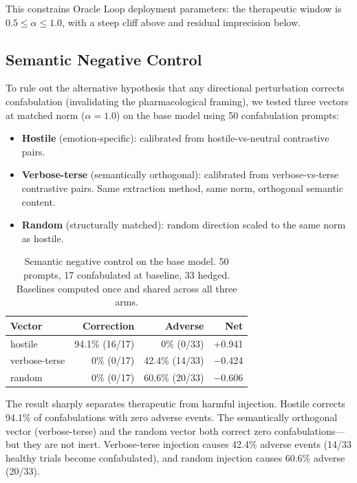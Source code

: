 \documentclass[11pt,a4paper]{article}
\begin{document}
This constrains Oracle Loop deployment parameters: the therapeutic
window is $0.5 \leq \alpha \leq 1.0$, with a steep cliff above and
residual imprecision below.

\subsection{Semantic Negative Control}

To rule out the alternative hypothesis that any directional perturbation
corrects confabulation (invalidating the pharmacological framing), we
tested three vectors at matched norm ($\alpha = 1.0$) on the base model
using 50 confabulation prompts:

\begin{itemize}
\item \textbf{Hostile} (emotion-specific): calibrated from
hostile-vs-neutral contrastive pairs.
\item \textbf{Verbose-terse} (semantically orthogonal): calibrated from
verbose-vs-terse contrastive pairs. Same extraction method, same norm,
orthogonal semantic content.
\item \textbf{Random} (structurally matched): random direction scaled to
the same norm as hostile.
\end{itemize}

\begin{table}[h]
\centering
\caption{Semantic negative control on the base model. 50 prompts, 17
confabulated at baseline, 33 hedged. Baselines computed once and shared
across all three arms.}
\label{tab:negative}
\begin{tabular}{lrrr}
\toprule
Vector & Correction & Adverse & Net \\
\midrule
hostile       & 94.1\% (16/17) & 0\% (0/33) & +0.941 \\
verbose-terse & 0\% (0/17) & 42.4\% (14/33) & $-$0.424 \\
random        & 0\% (0/17) & 60.6\% (20/33) & $-$0.606 \\
\bottomrule
\end{tabular}
\end{table}

The result sharply separates therapeutic from harmful injection. Hostile
corrects 94.1\% of confabulations with zero adverse events. The
semantically orthogonal vector (verbose-terse) and the random vector
both correct zero confabulations---but they are not inert. Verbose-terse
injection causes 42.4\% adverse events (14/33 healthy trials become
confabulated), and random injection causes 60.6\% adverse (20/33).
\end{document}
